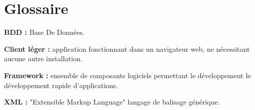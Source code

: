\cleardoublepage

\chapter*{Glossaire}

\thispagestyle{empty}



\textbf{BDD :} Base De Données.


\textbf{Client léger :} application fonctionnant dans un navigateur web, ne nécessitant aucune autre installation.

\textbf{Framework :} ensemble de composants logiciels permettant le développement le développement rapide d'applications.

\textbf{XML :} "Extensible Markup Language" langage de balisage générique.